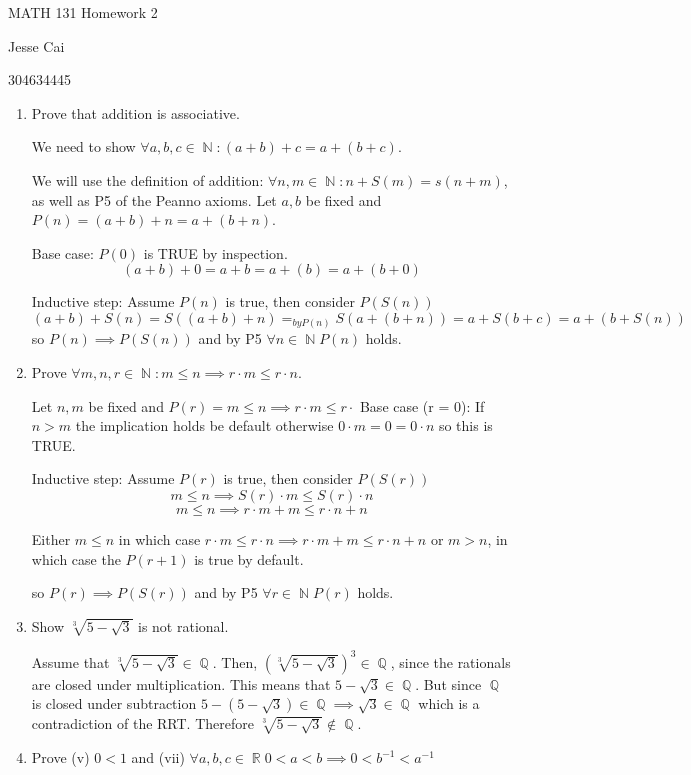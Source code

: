 \documentclass[10pt,a4paper]{article}
\DeclareMathOperator*{\R}{\mathbb{R}}
\DeclareMathOperator*{\Q}{\mathbb{Q}}
\DeclareMathOperator*{\N}{\mathbb{N}}
\begin{document}
MATH 131 Homework 2

Jesse Cai

304634445

\begin{enumerate}
    \item Prove that addition is associative.

        We need to show $\forall a,b,c \in \N:  (a+b)+c = a+(b+c)$. 

        We will use the definition of addition: $\forall n, m \in \N: n+S(m) = s(n+m)$, as well as P5 of the Peanno axioms.
        Let $a,b$ be fixed and $P(n) = (a +b)+n = a+ (b+n)$.

        Base case: $P(0)$ is TRUE by inspection.
        $$(a+b)+0 = a+b = a+(b) = a+(b+0)$$

        Inductive step: Assume $P(n)$ is true, then consider $P(S(n))$
        $$ (a+b) + S(n) = S((a+b)+n) =_{by P(n)} S(a+(b+n))  = a + S(b+c) = a  + (b + S(n))$$
        so $P(n) \implies P(S(n))$ and by P5 $\forall n \in \N P(n)$ holds.


    \item Prove $\forall m, n, r\in \N : m \leq n \implies r \cdot m \leq r \cdot n$.

        Let $n, m$ be fixed and $P(r)  = m \leq n \implies r \cdot m \leq r \cdot $
        Base case (r = 0):
            If $n > m$ the implication holds be default otherwise $0 \cdot m = 0 = 0 \cdot n$ so this is TRUE.

        Inductive step: Assume $P(r)$ is true, then consider $P(S(r))$
        $$m \leq n \implies S(r) \cdot m \leq S(r) \cdot n$$
        $$m \leq n \implies r \cdot m + m \leq r\cdot n + n$$

        Either $m \leq n$ in which case $r \cdot m \leq r\cdot n \implies r \cdot m + m \leq r\cdot n + n$ or $m > n$, in which case the $P(r+1)$ is true by default. 

        so $P(r) \implies P(S(r))$ and by P5 $\forall r \in \N P(r)$ holds.


    \item Show $\sqrt[3]{5 - \sqrt3}$ is not rational.

        Assume that $\sqrt[3]{5 - \sqrt3} \in \Q $.  Then, $\left(\sqrt[3]{5 - \sqrt3}\right)^3 \in \Q$, since the rationals are closed under multiplication.
        This means that $5 - \sqrt3 \in \Q$. But since $\Q$ is closed under subtraction $5 - (5 - \sqrt3) \in \Q \implies \sqrt3 \in \Q$ which is a contradiction of the RRT. Therefore $\sqrt[3]{5 - \sqrt3} \not \in \Q$.
    \item Prove (v) $0<1$ and (vii) $\forall a,b, c \in \R 0 < a < b \implies 0 < b^{-1} < a^{-1}$
    

\end{enumerate}
\end{document}
